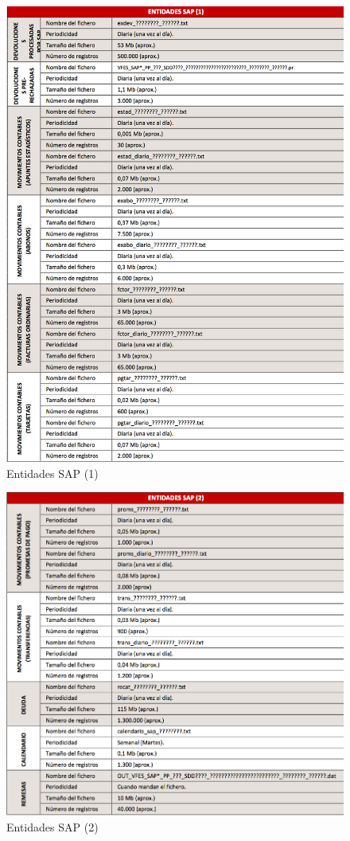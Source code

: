 \documentclass[a4paper, 12pt]{book}
\begin{document}
\begin{itemize}
	\begin{figure}
	  \centering
	  \includegraphics[width=14cm, keepaspectratio]{img/entidades7_1}
	  \caption{Entidades SAP (1)}
	  \label{fig:entidades7_1}
	\end{figure}

	\begin{figure}
	  \centering
	  \includegraphics[width=14cm, keepaspectratio]{img/entidades7_2}
	  \caption{Entidades SAP (2)}
	  \label{fig:entidades7_2}
	\end{figure}
	

\end{itemize}
\end{document}
